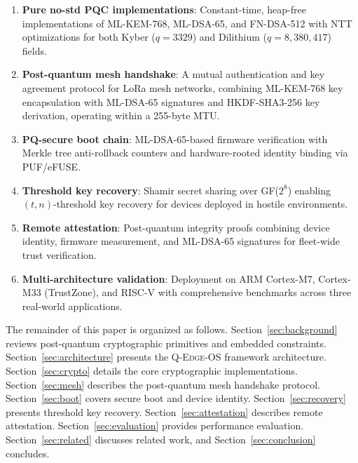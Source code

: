 \documentclass[conference,10pt]{IEEEtran}
\newcommand{\system}{\textsc{Q-Edge-OS}}
\begin{document}
\begin{enumerate}[leftmargin=*]
  \item \textbf{Pure no-std PQC implementations}: Constant-time, heap-free implementations of ML-KEM-768, ML-DSA-65, and FN-DSA-512 with NTT optimizations for both Kyber ($q=3329$) and Dilithium ($q=8{,}380{,}417$) fields.

  \item \textbf{Post-quantum mesh handshake}: A mutual authentication and key agreement protocol for LoRa mesh networks, combining ML-KEM-768 key encapsulation with ML-DSA-65 signatures and HKDF-SHA3-256 key derivation, operating within a 255-byte MTU.

  \item \textbf{PQ-secure boot chain}: ML-DSA-65-based firmware verification with Merkle tree anti-rollback counters and hardware-rooted identity binding via PUF/eFUSE.

  \item \textbf{Threshold key recovery}: Shamir secret sharing over GF($2^8$) enabling $(t,n)$-threshold key recovery for devices deployed in hostile environments.

  \item \textbf{Remote attestation}: Post-quantum integrity proofs combining device identity, firmware measurement, and ML-DSA-65 signatures for fleet-wide trust verification.

  \item \textbf{Multi-architecture validation}: Deployment on ARM Cortex-M7, Cortex-M33 (TrustZone), and RISC-V with comprehensive benchmarks across three real-world applications.
\end{enumerate}

The remainder of this paper is organized as follows. Section~\ref{sec:background} reviews post-quantum cryptographic primitives and embedded constraints. Section~\ref{sec:architecture} presents the \system{} framework architecture. Section~\ref{sec:crypto} details the core cryptographic implementations. Section~\ref{sec:mesh} describes the post-quantum mesh handshake protocol. Section~\ref{sec:boot} covers secure boot and device identity. Section~\ref{sec:recovery} presents threshold key recovery. Section~\ref{sec:attestation} describes remote attestation. Section~\ref{sec:evaluation} provides performance evaluation. Section~\ref{sec:related} discusses related work, and Section~\ref{sec:conclusion} concludes.

\end{document}
